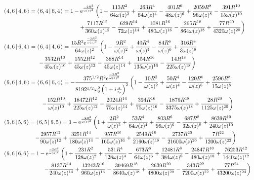 \documentclass[11pt]{amsart}
\makeatletter
\newcommand{\e}{{\rm e}}				%
\newcommand{\msp}[1]{\mspace{#1mu}}		%
\newcommand{\0}{\varnothing}		%
\newcommand{\brac}[2]{\left\langle\msp{2} #1\left\lvert \msp{3.5} #2 \right.\right\rangle}	%
\newcommand{\1}{!}
\newcommand{\2}{@}
\newcommand{\3}{\#}
\newcommand{\4}{\$}
\newcommand{\5}{\%}
\newcommand{\6}{$^\wedge$}
\newcommand{\7}{\&}
\newcommand{\8}{*}
\newcommand{\9}{(}
\makeatother
\begin{document}
\begin{align*}
\\
&
\brac{4,6}{4,6} = \brac{6,4}{6,4} = 1-\e^{\frac{-2R^2}{\omega(z)^2}}\left(1+\frac{113R^2}{64\omega(z)^2}+\frac{263R^4}{64\omega(z)^4}-\frac{401R^6}{48\omega(z)^6}+\frac{2059R^8}{96\omega(z)^8}-\frac{391R^{10}}{15\omega(z)^{10}}\right.
\\
&
\msp{240}\left.+\frac{7117R^{12}}{360\omega(z)^{12}}-\frac{629R^{14}}{72\omega(z)^{14}}+\frac{1081R^{16}}{480\omega(z)^{16}}-\frac{265R^{18}}{864\omega(z)^{18}}+\frac{77R^{20}}{4320\omega(z)^{20}}\right)
\\
&
\brac{4,6}{6,4} = \brac{6,4}{4,6} =\frac{15R^2\e^{\frac{-2R^2}{\omega(z)^2}}}{64\omega(z)^2}\left(1-\frac{9R^2}{\omega(z)^2}+\frac{40R^4}{\omega(z)^4}-\frac{84R^6}{\omega(z)^6}+\frac{316R^8}{3\omega(z)^8}
\right.
\\
&
\msp{110}\left.-\frac{3532R^{10}}{45\omega(z)^{10}}+\frac{1552R^{12}}{45\omega(z)^{12}}-\frac{388R^{14}}{45\omega(z)^{14}}+\frac{154R^{16}}{135\omega(z)^{16}}-\frac{14R^{18}}{225\omega(z)^{18}}\right)
\\
&
\brac{6,6}{4,6} = \brac{6,6}{6,4} =-\frac{375^{1/2}R^2\e^{\frac{-2R^2}{\omega(z)^2}}}{8192^{1/2}\omega_0^2\left(1+i\frac{z}{z_r}\right)^2}\left(1-\frac{10R^2}{\omega(z)^2}+\frac{50R^4}{\omega(z)^4}-\frac{120R^6}{\omega(z)^6}+\frac{2596R^8}{15\omega(z)^8}\right.
\\
&
\msp{120}\left.-\frac{152R^{10}}{\omega(z)^{10}}+\frac{18472R^{12}}{225\omega(z)^{12}}-\frac{2024R^{14}}{75\omega(z)^{14}}+\frac{394R^{16}}{75\omega(z)^{16}}-\frac{1876R^{18}}{3375\omega(z)^{18}}+\frac{28R^{20}}{1125\omega(z)^{20}}\right)
\end{align*}
\begin{align*}
&\brac{5,6}{5,6}=\brac{6,5}{6,5} = 1-\e^{\frac{-2R^2}{\omega(z)^2}}\left(1+\frac{2R^2}{\omega(z)^2}+\frac{53R^4}{64\omega(z)^4}+\frac{803R^6}{96\omega(z)^6}-\frac{687R^8}{32\omega(z)^8}+\frac{8639R^{10}}{240\omega(z)^{10}}
\right.
\\
&
\msp{100}\left.-\frac{2957R^{12}}{90\omega(z)^{12}}+\frac{3251R^{14}}{180\omega(z)^{14}}-\frac{957R^{16}}{160\omega(z)^{16}}+\frac{2549R^{18}}{2160\omega(z)^{18}}-\frac{2737R^{20}}{21600\omega(z)^{20}}+\frac{7R^{22}}{1200\omega(z)^{22}}\right)
\\
&
\brac{6,6}{6,6} = 1-\e^{\frac{-2R^2}{\omega(z)^2}}\left(1+\frac{231R^2}{128\omega(z)^2}+\frac{531R^4}{128\omega(z)^4}-\frac{673R^6}{64\omega(z)^6}+\frac{12481R^8}{384\omega(z)^8}-\frac{24847R^{10}}{480\omega(z)^{10}}+\frac{76253R^{12}}{1440\omega(z)^{12}}\right.
\\
&
\left.
\msp{130}-\frac{8137R^{14}}{240\omega(z)^{14}}+\frac{13243R^{16}}{960\omega(z)^{16}}-\frac{30469R^{18}}{8640\omega(z)^{18}}+\frac{2639R^{20}}{4800\omega(z)^{20}}-\frac{343R^{22}}{7200\omega(z)^{22}}+\frac{77R^{24}}{43200\omega(z)^{24}}\right)
\end{align*}
\end{document}
